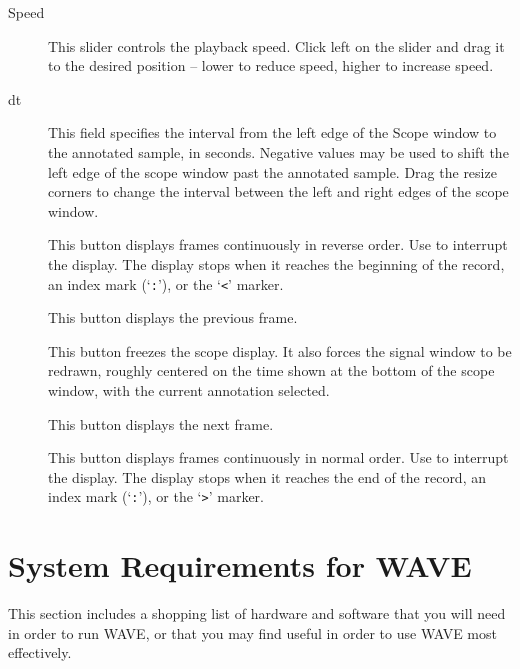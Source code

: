 \documentclass[twoside]{book}
\newcommand{\button}[1]{\cornersize{2}\ovalbox{\rule[-.3mm]{0cm}{2.5mm}\small\sf ~#1~}}
\newcommand{\WAVE}{{\sf WAVE}\xspace}
\begin{document}
\begin{description}
\item[{\sf Speed}]
This slider controls the playback speed.  Click left on the slider and drag it
to the desired position -- lower to reduce speed, higher to increase speed.

\item[{\sf dt}]
This field specifies the interval from the left edge of the {\sf Scope} window
to the annotated sample, in seconds.  Negative values may be used to shift the
left edge of the scope window past the annotated sample.  Drag the resize
corners to change the interval between the left and right edges of the scope
window.

\item[\button{\tt <<}]
This button displays frames continuously in reverse order.  Use \button{Pause}
to interrupt the display.  The display stops when it reaches the
beginning of the record, an index mark (`{\tt :}'), or the `{\tt <}' marker.

\item[\button{\tt <}]
This button displays the previous frame.

\item[\button{Pause}]
This button freezes the scope display.  It also forces the signal window to be
redrawn, roughly centered on the time shown at the bottom of the scope window,
with the current annotation selected.

\item[\button{\tt >}]
This button displays the next frame.

\item[\button{\tt >>}]
This button displays frames continuously in normal order.  Use \button{Pause}
to interrupt the display.  The display stops when it reaches the end of
the record, an index mark (`{\tt :}'), or the `{\tt >}' marker.
\end{description}

\chapter{System Requirements for \WAVE{}}

\label{app:system-requirements}
This section includes a shopping list of hardware and software that you will
need in order to run \WAVE{}, or that you may find useful in order to use
\WAVE{} most effectively.
\end{document}
